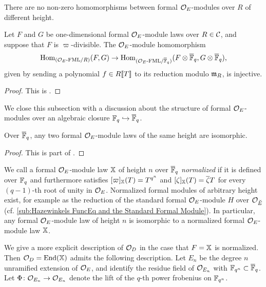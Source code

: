 \documentclass[../main.tex]{subfiles}
\begin{document}
\begin{lem}\label{lem:NoNonzeroHomsBetweenDiffHeight}
  There are no non-zero homomorphisms between formal $\mathcal{O}_E$-modules 
  over $R$ of different height.
\end{lem}

\begin{prop}\label{prop:ReductionOfHomsIsInjective}
  Let $F$ and $G$ be one-dimensional formal $\mathcal{O}_E$-module laws over $R \in \mathcal{C}$,
  and suppose that $F$ is $\varpi$-divisible.
  The $\mathcal{O}_E$-module homomorphism
  \begin{equation*}
    \operatorname{Hom}_{{({\mathcal{O}_E}\textnormal-\allowbreak\mathrm{FML}/{R})}} (F,G) \to \operatorname{Hom}_{{({\mathcal{O}_E}\textnormal-\allowbreak\mathrm{FML}/{{\overline {\mathbb{F}}_q}})}}(F \otimes {\overline{\mathbb{F}}_q}
    , G \otimes {\overline{\mathbb{F}}_q}),
  \end{equation*}
  given by sending a polynomial $f \in R\llbracket T \rrbracket$ to its reduction modulo
  $\mathfrak{m}_R$, is injective.
\begin{proof}
  This is \cite[Proposition 4.2]{hopkins1994equivariant}.
\end{proof}
\end{prop}


We close this subsection with a discussion about the structure of 
formal $\mathcal{O}_E$-modules over an algebraic closure $\mathbb{F}_q \hookrightarrow {\overline{\mathbb{F}}_q}$. 

\begin{prop}\label{prop:classificationofmodulelawsbyheight}
  Over ${\overline {\mathbb{F}}_q}$, any two formal $\mathcal{O}_E$-module laws of the same
  height are isomorphic.
\begin{proof}
  This is part of \cite[Proposition 1.7]{drinfel1974elliptic}.
\end{proof}
\end{prop}

We call a formal $\mathcal{O}_E$-module law $\mathbb{X}$ of height
$n$ over ${\overline {\mathbb{F}}_q}$ \emph{normalized} if it is defined over $\mathbb{F}_q$ and furthermore
satisfies $[\varpi]_{\mathbb{X}}(T) = T^{q^n}$ and $[\zeta]_{\mathbb{X}}(T) = \overline \zeta T$
for every $(q-1)$-th root of unity in $\mathcal{O}_E$.
Normalized formal modules of arbitrary height exist, for example as the
reduction of the standard formal $\mathcal{O}_E$-module $H$ over $\mathcal{O}_{\breve {E}}$ (cf.
\cref{sub:Hazewinkels FuncEq and the Standard Formal Module}).
In particular, any formal $\mathcal{O}_E$-module law of height $n$ is isomorphic to 
a normalized formal $\mathcal{O}_E$-module law $\mathbb{X}$.

We give a more explicit description of $\mathcal{O}_D$ in the case that $F = \mathbb{X}$ 
is normalized. 
Then $\mathcal{O}_D = \operatorname{End}(\mathbb{X})$ admits the following description. Let 
$E_n$ be the degree $n$ unramified extension of $\mathcal{O}_E$, and identify
the residue field of $\mathcal{O}_{E_n}$ with $\mathbb{F}_{q^n} \subset {\overline{\mathbb{F}}_q}$. Let 
$\Phi\colon \mathcal{O}_{E_n} \to \mathcal{O}_{E_n}$ denote the lift of the 
$q$-th power frobenius on $\mathbb{F}_{q^n}$. 
\end{document}
